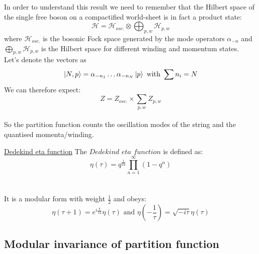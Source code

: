 \documentclass[11pt,aspectratio=169]{beamer}
\begin{document}
\begin{frame}
	In order to understand this result we need to remember that the Hilbert space of the single free boson on a compactified world-sheet is in fact a product state:
	\begin{equation}
		\mathcal{H} = \mathcal{H}_{osc.} \otimes \bigoplus_{p, w} \mathcal{H}_{p, w}
	\end{equation}
	where $\mathcal{H}_{osc.}$ is the bosonic Fock space generated by the mode operators $\alpha_{-n}$ and $\bigoplus_{p, w} \mathcal{H}_{p, w}$ is the Hilbert space for different winding and momentum states.
	\\
	Let's denote the vectors as 
	\begin{equation}
		\ket{N,p} = \alpha_{-n_1} \dots \alpha_{-n_N} \ket{p} \textrm{ with } \sum n_i = N
	\end{equation}
	We can therefore expect:
	\begin{equation}
		Z = Z_{osc.} \times \sum_{p,w} Z_{p,w}
	\end{equation}
	\\
	So the partition function counts the oscillation modes of the string and the quantised momenta/winding.
\end{frame}

\begin{frame}{\underline{Dedekind eta function}}
	The $\textit{Dedekind eta function}$ is defined as:
	\begin{equation}
		\eta(\tau) = q^{\frac{1}{24}}\prod_{n=1}^{\infty}(1 - q^n)
	\end{equation}
	\\~\\
	It is a modular form with weight $\frac{1}{2}$ and obeys:
	\begin{equation}
		\eta(\tau + 1) = e^{i\frac{\pi}{12}} \eta(\tau) \textrm{ and } \eta(-\frac{1}{\tau}) = \sqrt{-i\tau}\eta(\tau)
	\end{equation}
	
\end{frame}

\subsection{Modular invariance of partition function}
\end{document}
